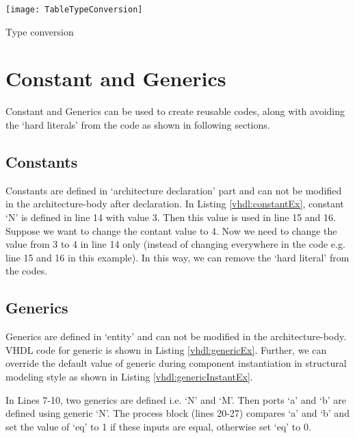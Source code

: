 \begin{table}
	\centering
	\texttt{[image: TableTypeConversion]}
	\caption{Type conversion}
	\label{tbl:TableTypeConversion}
\end{table}






\section{Constant and Generics}
Constant and Generics can be used to create reusable codes, along with avoiding the `hard literals' from the code as shown in following sections. 

\subsection{Constants}\label{sec:Constants}
Constants are defined in `architecture declaration' part and can not be modified in the architecture-body after declaration. In Listing \ref{vhdl:constantEx}, constant `N' is defined in line 14 with value 3. Then this value is used in line 15 and 16. Suppose we want to change the contant value to 4. Now we need to change the value from 3 to 4 in line 14 only (instead of changing everywhere in the code e.g. line 15 and 16 in this example). In this way, we can remove the `hard literal' from the codes.  



\subsection{Generics}\label{subsec:Generic}
Generics are defined in `entity' and can not be modified in the architecture-body. VHDL code for generic is shown in Listing \ref{vhdl:genericEx}. Further, we can override the default value of generic during component instantiation in structural modeling style as shown in Listing \ref{vhdl:genericInstantEx}. 

\begin{explanation}
	In Lines 7-10, two generics are defined i.e. `N' and `M'. Then ports `a' and `b' are defined using generic `N'. The process block (lines 20-27) compares `a' and `b' and set the value of `eq' to 1 if these inputs are equal, otherwise set `eq' to 0. 
\end{explanation}


